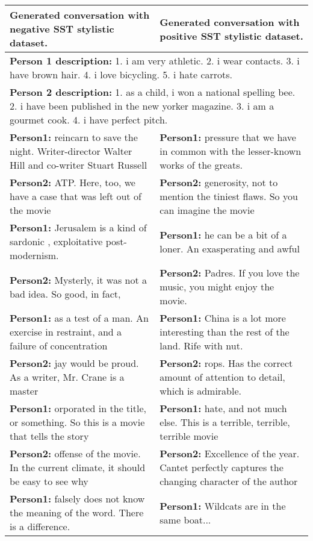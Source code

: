 \begin{table}[H]
\centering
 \begin{tabular}{|p{7cm}|p{7cm}|} 
 \hline
 \textbf{Generated conversation with negative SST stylistic dataset.} & \textbf{Generated conversation with positive SST stylistic dataset.}\\
 \hline
 \multicolumn{2}{|p{14cm}|}{\textbf{Person 1 description:} 1. i am very athletic. 2. i wear contacts. 3. i have brown hair. 4. i love bicycling. 5. i hate carrots.} \\
 \hline
 \multicolumn{2}{|p{14cm}|}{\textbf{Person 2 description:} 1. as a child, i won a national spelling bee. 2. i have been published in the new yorker magazine. 3. i am a gourmet cook. 4. i have perfect pitch.} \\
 \hline
 \textbf{Person1:} reincarn to save the night. Writer-director Walter Hill and co-writer Stuart Russell & \textbf{Person1:} pressure that we have in common with the lesser-known works of the greats. \\
 \textbf{Person2:} ATP.  Here, too, we have a case that was left out of the movie & \textbf{Person2:} generosity, not to mention the tiniest flaws. So you can imagine the movie \\ 
 \textbf{Person1:} Jerusalem is a kind of sardonic , exploitative post-modernism. & \textbf{Person1:} he can be a bit of a loner. An exasperating and awful \\
 \textbf{Person2:} Mysterly, it was not a bad idea.  So good, in fact,  & \textbf{Person2:} Padres. If you love the music, you might enjoy the movie. \\
 \textbf{Person1:} as a test of a man.  An exercise in restraint, and a failure of concentration & \textbf{Person1:} China is a lot more interesting than the rest of the land. Rife with nut. \\
 \textbf{Person2:} jay would be proud.  As a writer, Mr. Crane is a master & \textbf{Person2:} rops. Has the correct amount of attention to detail, which is admirable. \\
 \textbf{Person1:} orporated in the title, or something.  So this is a movie that tells the story & \textbf{Person1:} hate, and not much else. This is a terrible, terrible, terrible movie \\
 \textbf{Person2:} offense of the movie.  In the current climate, it should be easy to see why & \textbf{Person2:} Excellence of the year. Cantet perfectly captures the changing character of the author  \\
 \textbf{Person1:} falsely does not know the meaning of the word. There is a difference. & \textbf{Person1:} Wildcats are in the same boat... \\

\end{tabular}
\end{table}
